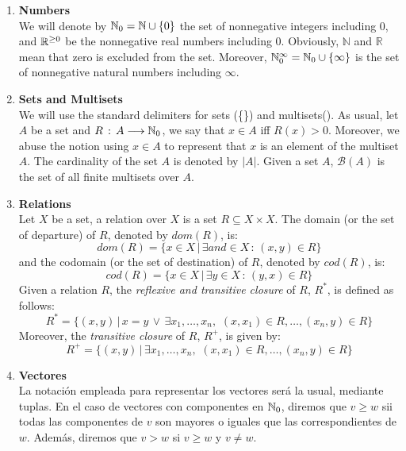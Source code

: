 \begin{enumerate}
\item {\bf Numbers}\\
We will denote by $\mathbb{N}_{0} = \mathbb{N} \cup \{0\}$ the set of nonnegative integers including 0,
and $\mathbb{R}^{\geq 0}$ be the nonnegative real numbers including 0. Obviously, $\mathbb{N}$
and $\mathbb{R}$ mean that zero is excluded from the set. Moreover,
$\mathbb{N}_{0}^{\infty} = \mathbb{N}_{0} \cup \left\{\infty \right\}$ is the set of nonnegative natural numbers including $\infty$. 

\item {\bf Sets and Multisets}\\
We will use the standard delimiters for sets (\{\}) and multisets(\multiset{}). 
As usual, let $A$ be a set and $R\,:\,A \longrightarrow \mathbb{N}_{0}$, we say 
that $x \in A$ iff $R(x) > 0$.
Moreover, we abuse the notion using $x \in A$ to represent that $x$ is an element of
the multiset $A$. The cardinality of the set $A$
is denoted by $|A|$. Given a set $A$,
${\mathcal B}(A)$ is the set of all finite multisets over $A$.


\item {\bf Relations}\\
Let $X$ be a set, a relation over $X$ is a set $R \subseteq X \times X$. 
The domain (or the set of departure) of $R$, denoted by $dom(R)$, is:
\[dom(R) = \{ x \in X \,|\, \exists
and \in X\,:\, (x,y) \in R \}\]
and the codomain (or the set of destination) of $R$, denoted by $cod(R)$, is:
\[cod(R) = \{ x \in X \,|\, \exists y \in X\,:\,(y,x) \in R\}\]
Given a relation $R$, the {\it reflexive and transitive closure} of $R$, $R^*$, is defined as follows:
\[ R^* = \{ (x,y)\,|\,x=y \,\vee\,
\exists x_1,\ldots,x_n,\,\,(x,x_1)\in R,\ldots,(x_n,y) \in R\}\]
Moreover, the {\it transitive closure} of $R$, $R^+$, is given by:
\[R^+ = \{ (x,y)\,|\,
\exists x_1,\ldots,x_n,\,\,(x,x_1)\in R,\ldots,(x_n,y) \in R\}\]

\item {\bf Vectores}\\
La notaci\'{o}n empleada para representar los vectores
ser\'{a} la usual, mediante tuplas. En el caso de vectores con componentes
en $\mathbb{N}_{0}$, diremos que $v \geq w$ sii todas las componentes de $v$
son mayores o iguales que las correspondientes de $w$. Adem\'{a}s,
diremos que $v > w$ si $v \geq w$ y $v \neq w$.
\end{enumerate}




